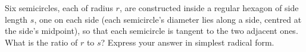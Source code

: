 Six semicircles, each of radius $r$, are constructed inside a regular hexagon of side length $s$, one on each side (each semicircle's diameter lies along a side, centred at the side's midpoint), so that each semicircle is tangent to the two adjacent ones. What is the ratio of $r$ to $s$? Express your answer in simplest radical form.
